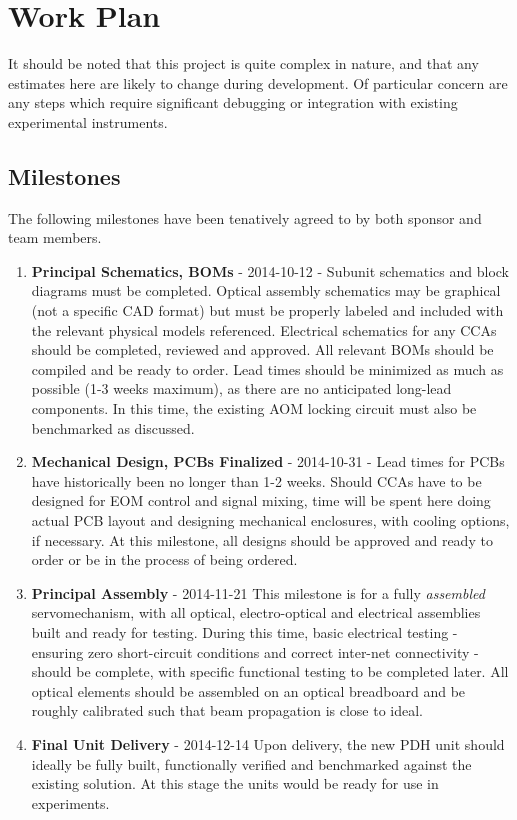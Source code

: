 \newpage
\section{Work Plan}

It should be noted that this project is quite complex in nature, and that
any estimates here are likely to change during development. Of particular
concern are any steps which require significant debugging or integration with
existing experimental instruments.

\subsection{Milestones} %

The following milestones have been tenatively agreed to by both sponsor and
team members.

\begin{enumerate}
  \item{\textbf{Principal Schematics, BOMs} - 2014-10-12}
  - Subunit schematics
  and block diagrams must be completed. Optical assembly schematics may be
  graphical (not a specific CAD format) but must be properly labeled and
  included with the relevant physical models referenced. Electrical schematics
  for any CCAs should be completed, reviewed and approved. All
  relevant BOMs should be compiled and be ready to order. Lead times should be
  minimized as much as possible (1-3 weeks maximum), as there are no
  anticipated long-lead components. In this time, the existing AOM locking
  circuit must also be benchmarked as discussed.
  \item{\textbf{Mechanical Design, PCBs Finalized} - 2014-10-31}
  - Lead times for PCBs have historically been no longer than 1-2 weeks. Should
  CCAs have to be designed
  for EOM control and signal mixing, time will be spent here doing actual PCB
  layout and designing mechanical enclosures, with cooling options, if
  necessary. At this milestone, all designs should be approved and ready to
  order or be in the process of being ordered.
  \item{\textbf{Principal Assembly} - 2014-11-21}  This milestone is for a
  fully \emph{assembled} servomechanism, with all optical, electro-optical and
  electrical assemblies built and ready for testing. During this time,
  basic electrical testing - ensuring zero short-circuit conditions and correct
  inter-net connectivity - should be complete, with specific functional testing
  to be completed later. All optical elements should be assembled on an optical
  breadboard and be roughly calibrated such that beam propagation is close to
  ideal.
  \item{\textbf{Final Unit Delivery} - 2014-12-14} Upon delivery, the
  new PDH unit should ideally be fully built, functionally verified and
  benchmarked against the existing solution. At this stage the units would be
  ready for use in experiments.
\end{enumerate}

